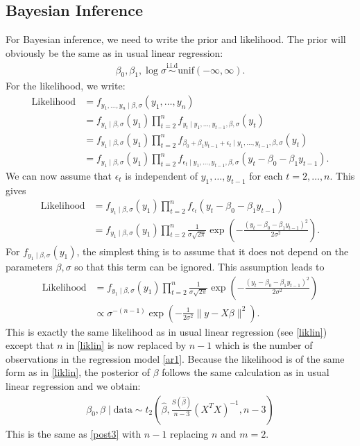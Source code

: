 \documentclass{scrartcl}
\begin{document}
\subsection{Bayesian Inference}
For Bayesian inference, we need to write the prior and likelihood. The
prior will obviously be the same as in usual linear regression:
\begin{align*}
  \beta_0, \beta_1, \log \sigma \overset{\text{i.i.d}}{\sim}
  \text{unif}(-\infty, \infty). 
\end{align*}
For the likelihood, we write:
\begin{align*}
  \text{Likelihood} &= f_{y_1, \dots, y_n \mid \beta, \sigma}(y_1,
                      \dots, y_n) \\
  &= f_{y_1 \mid \beta, \sigma}(y_1) \prod_{t=2}^{n} f_{y_t \mid y_1,
    \dots, y_{t-1}, \beta, \sigma}(y_t) \\
  &= f_{y_1 \mid \beta, \sigma}(y_1) \prod_{t=2}^n f_{\beta_0 +
    \beta_1 y_{t-1} + \epsilon_t \mid y_1, \dots, y_{t-1}, \beta,
    \sigma} (y_t) \\
  &= f_{y_1 \mid \beta, \sigma}(y_1) \prod_{t=2}^n f_{\epsilon_t \mid
    y_1, \dots, y_{t-1}, \beta, \sigma} (y_t - \beta_0 - \beta_1
    y_{t-1}). 
\end{align*}
We can now assume that $\epsilon_t$ is independent of $y_1, \dots,
y_{t-1}$ for each $t = 2, \dots, n$. This gives
\begin{align*}
  \text{Likelihood} &= f_{y_1 \mid \beta, \sigma}(y_1) \prod_{t=2}^n
                      f_{\epsilon_t}(y_t - \beta_0 - \beta_1 y_{t-1}) \\
  &= f_{y_1 \mid \beta, \sigma}(y_1) \prod_{t=2}^n
    \frac{1}{\sigma\sqrt{2 \pi}} \exp \left(-\frac{(y_t - \beta_0 -
    \beta_1 y_{t-1})^2}{2 \sigma^2} \right). 
\end{align*}
For $f_{y_1 \mid \beta, \sigma}(y_1)$, the simplest thing is to assume
that it does not depend on the parameters $\beta, \sigma$ so that this
term can be ignored. This assumption leads to
\begin{align}
  \text{Likelihood} &= f_{y_1 \mid \beta, \sigma}(y_1) \prod_{t=2}^n
    \frac{1}{\sigma\sqrt{2 \pi}} \exp \left(-\frac{(y_t - \beta_0 -
    \beta_1 y_{t-1})^2}{2 \sigma^2} \right) \nonumber \\ &\propto \sigma^{-(n-1)}
                      \exp \left(-\frac{1}{2 \sigma^2} \|y - X
                      \beta\|^2 \right). \label{like_ar}
\end{align}
This is exactly the same likelihood as in usual linear regression (see
\eqref{liklin}) except that $n$ in \eqref{liklin} is now replaced by
$n-1$ which is the number of observations in the regression model
\eqref{ar1}. Because the likelihood is of the same form as in
\eqref{liklin}, the posterior of $\beta$ follows the same calculation
as in usual linear regression and we obtain:
\begin{align*}
  \beta_0, \beta \mid \text{data} \sim t_{2} \left(\hat{\beta},
  \frac{S(\hat{\beta})}{n-3} (X^T X)^{-1}, n-3 \right) 
\end{align*}
This is the same as \eqref{post3} with $n-1$ replacing $n$ and $m =
2$.
\end{document}
